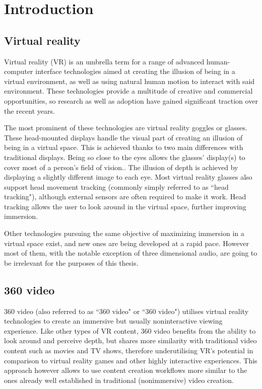 
\chapter{Introduction}

\section*{Virtual reality}
Virtual reality (VR) is an umbrella term for a range of advanced human-computer interface technologies aimed at 
creating the illusion of being in a virtual environment, as well as using natural human motion to interact with said environment.
These technologies provide a multitude of creative and commercial opportunities, 
so research as well as adoption have gained significant traction over the recent years. 

The most prominent of these technologies are virtual reality goggles or glasses.
These head-mounted displays handle the visual part of creating an illusion of being in a virtual space.
This is achieved thanks to two main differences with traditional displays.
Being so close to the eyes allows the glasses' display(s) to cover most of a person's field of vision..
The illusion of depth is achieved by displaying a slightly different image to each eye.
Most virtual reality glasses also support head movement tracking (commonly simply referred to as ``head tracking"),
although external sensors are often required to make it work.
Head tracking allows the user to look around in the virtual space, further improving immersion.

Other technologies pursuing the same objective of maximizing immersion in a virtual space exist, and new ones are being developed at a rapid pace.
However most of them, with the notable exception of three dimensional audio, are going to be irrelevant for the purposes of this thesis.

\section*{360\degree{} video}

360\degree{} video (also referred to as ``360 video" or ``360\degree{} video") utilises virtual reality technologies to create an immersive but usually noninteractive viewing experience.
Like other types of VR content, 360\degree{} video benefits from the ability to look around and perceive depth,
but shares more similarity with traditional video content such as movies and TV shows,
therefore underutilising VR's potential in comparison to virtual reality games and other highly interactive experiences. 
This approach however allows to use content creation workflows more similar to the ones already well established in traditional (nonimmersive) video creation.

